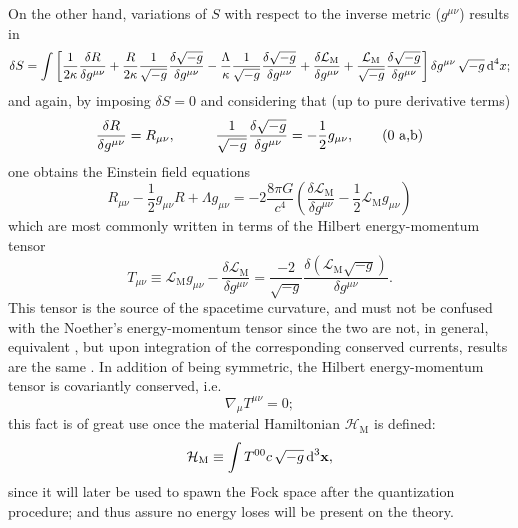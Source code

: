 
On the other hand, variations of $S$ with respect to the inverse metric ($g^{\mu\nu}$) results in
\begin{multline}
	\delta S=\int \left[\frac{1}{2\kappa}\frac{\delta R}{\delta g^{\mu\nu}}+\frac{R}{2\kappa}\frac{1}{\sqrt{-g}}\frac{\delta \sqrt{-g}}{\delta g^{\mu\nu}}-\frac{\Lambda}{\kappa}\frac{1}{\sqrt{-g}}\frac{\delta\sqrt{-g}}{\delta g^{\mu\nu}}+\frac{\delta\mathcal{L}_{\text{M}}}{\delta g^{\mu\nu}}+\frac{\mathcal{L}_{\text{M}}}{\sqrt{-g}}\frac{\delta\sqrt{-g}}{\delta g^{\mu\nu}}\right]\delta g^{\mu\nu}\,\sqrt{-g}\,\text{d}^4x;
\end{multline}
and again, by imposing $\delta S=0$ and considering that (up to pure derivative terms)
\begin{subequations}
	\begin{gather}
		\frac{\delta R}{\delta g^{\mu\nu}}=R_{\mu\nu},\hspace{1.0cm}\frac{1}{\sqrt{-g}}\frac{\delta\sqrt{-g}}{\delta g^{\mu\nu}}=-\frac{1}{2}g_{\mu\nu},\tag{\theequation \,\,a,b}
	\end{gather}
\end{subequations}
one obtains the Einstein field equations
\begin{equation}\label{eq: Einstein Field Equations}
	R_{\mu\nu}-\frac{1}{2}g_{\mu\nu}R+\Lambda g_{\mu\nu}=-2\frac{8\pi G}{c^4}\left(\frac{\delta\mathcal{L}_{\text{M}}}{\delta g^{\mu\nu}}-\frac{1}{2}\mathcal{L}_{\text{M}}g_{\mu\nu}\right)
\end{equation}
which are most commonly written in terms of the Hilbert energy-momentum tensor
\begin{equation}\label{eq: Hilbert energy-momentum tensor}
	T_{\mu\nu}\equiv \mathcal{L}_{\text{M}}g_{\mu\nu}-\frac{\delta\mathcal{L}_{\text{M}}}{\delta g^{\mu\nu}}=\frac{-2}{\sqrt{-g}}\frac{\delta \left(\mathcal{L}_{\text{M}}\sqrt{-g}\right)}{\delta g^{\mu\nu}}.
\end{equation}
This tensor is the source of the spacetime curvature, and must not be confused with the Noether's energy-momentum tensor since the two are not, in general, equivalent \cite{Energy-MomentumTensor}, but upon integration of the corresponding conserved currents, results are the same \cite{NoetherVsHilbert}. In addition of being symmetric, the Hilbert energy-momentum tensor is covariantly conserved, i.e.
\begin{equation}
	\nabla_\mu T^{\mu\nu}=0;
\end{equation}
this fact is of great use once the material Hamiltonian $\mathcal{H}_{\text{M}}$ is defined:
\begin{equation}\label{eq: General Hamiltonian}
	\mathcal{H}_{\text{M}}\equiv \int T^{00}c\,\sqrt{-g}\,\text{d}^3\mathbf{x},
\end{equation}
since it will later be used to spawn the Fock space after the quantization procedure; and thus assure no energy loses will be present on the theory.
